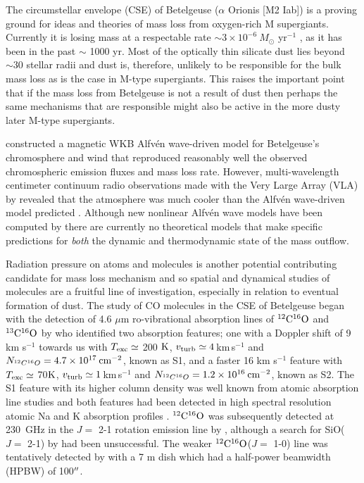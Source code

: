 \documentclass[iop]{emulateapj}
\begin{document}
The circumstellar envelope (CSE) of Betelgeuse ($\alpha$ Orionis [M2 Iab]) is a proving ground for ideas and theories of mass loss from oxygen-rich M supergiants. Currently it is losing mass at a respectable rate $\sim 3\times 10^{-6} \ M{}_{\odot}$ yr${}^{-1}$ \citep{1986ApJ...306..605G, 1994ApJ...424L.127H,harper_2001}, as it has been in the past $\sim$ 1000 yr. Most of the optically thin silicate dust lies beyond $\sim 30$ stellar radii \citep{1994AJ....107.1469D} and dust is, therefore, unlikely to be responsible for the bulk mass loss as is the case in M-type supergiants. This raises the important point that if the mass loss from Betelgeuse is not a result of dust then perhaps the same mechanisms that are responsible might also be active in the more dusty later M-type supergiants. 

\cite{1984ApJ...284..238H} constructed a magnetic WKB Alfv\'{e}n wave-driven model for Betelgeuse's chromosphere and wind that reproduced reasonably well the observed chromospheric emission fluxes and mass loss rate. However, multi-wavelength centimeter continuum radio observations made with the Very Large Array (VLA) by \cite{1998Natur.392..575L} revealed that the atmosphere was much cooler than the Alfv\'{e}n wave-driven model predicted \citep{harper_2001}. Although  new nonlinear Alfv\'{e}n wave models have been computed by \cite{2000ApJ...528..965A} there are currently no theoretical models that make specific predictions for {\em both} the dynamic and thermodynamic state of the mass outflow. 

Radiation pressure on atoms and molecules is another potential contributing candidate for mass loss mechanism and so spatial and dynamical studies of molecules are a fruitful line of investigation, especially in relation to eventual formation of dust. The study of CO molecules in the CSE of Betelgeuse began with the detection of 4.6 $\mu$m ro-vibrational absorption lines of $\rm{{}^{12}C^{16}O}$ and $\rm{{}^{13}C^{16}O}$ by \cite{1979ApJ...233L.135B} who identified two absorption features; one with a Doppler shift of 9 km s${}^{-1}$ towards us with $T_{\rm{exc}} \simeq$ 200 $\rm{K}$, $v_{\rm{turb}}\simeq 4$\,km\,s${}^{-1}$ and $N_{^{12}C^{16}O}=4.7\times 10^{17}\>{\rm cm}^{-2}$, known as S1, and a faster 16 km s${}^{-1}$ feature with $T_{\rm{exc}} \simeq$ 70$\rm{K}$, $v_{\rm{turb}}\simeq 1$\,km\,s${}^{-1}$ and $N_{^{12}C^{16}O}=1.2\times 10^{16}\>{\rm cm}^{-2}$, known as S2. The S1 feature with its higher column density was well known from atomic absorption line studies \citep[e.g.][]{1962ApJ...136..844W} and both features had been detected in high spectral resolution atomic Na and K absorption profiles \citep{1975ApJ...199..427G}. $\rm{{}^{12}C^{16}O}$ was subsequently detected at 230~GHz in the $J=$ 2-1 rotation emission line by \cite{1980ApJ...242L..25K}, although a search for SiO($J=$ 2-1) by \cite{1978ApJ...221..854L} had been unsuccessful. The weaker $\rm{{}^{12}C^{16}O}$($J=$ 1-0) line was tentatively detected by \cite{1985ApJ...292..640K} with a 7 m dish which had a half-power beamwidth (HPBW) of 100$\mbox{$^{\prime\prime}$}$.
\end{document}

